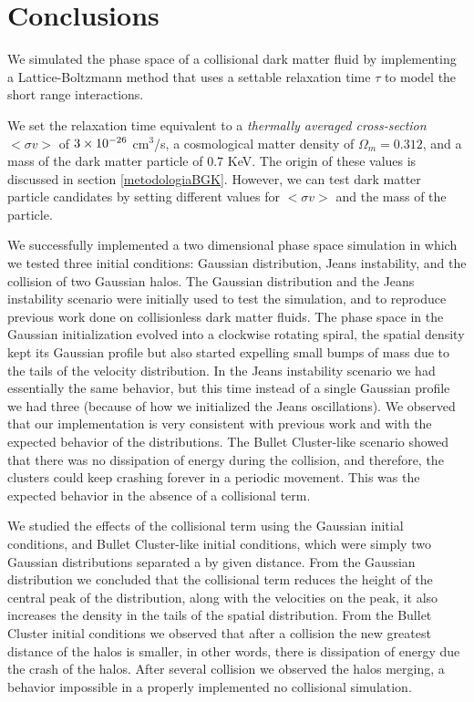 \chapter{Conclusions}
We simulated the phase space of a collisional dark matter fluid by implementing a Lattice-Boltzmann method that uses a settable relaxation time $\tau$ to model the short range interactions. 

We set the relaxation time equivalent to a \emph{thermally averaged cross-section}  $<\sigma v>$ of $ 3 \times 10^{-26}$ cm$^3$/s, a cosmological matter density of $\Omega_m = 0.312$, and a mass of the dark matter particle of $0.7$ KeV. The origin of these values is discussed in section \ref{metodologiaBGK}. However, we can test dark matter particle candidates by setting different values for $<\sigma v>$ and the mass of the particle.

We successfully implemented a two dimensional phase space simulation in which we tested three initial conditions: Gaussian distribution, Jeans instability, and the collision of two Gaussian halos. 
The Gaussian distribution and the Jeans instability scenario were initially used to test the simulation, and to reproduce previous work done on collisionless dark matter fluids. 
The phase space in the Gaussian initialization evolved into a clockwise rotating spiral, the spatial density kept its Gaussian profile but also started expelling small bumps of mass due to the tails of the velocity distribution.
In the Jeans instability scenario we had essentially the same behavior, but this time instead of a single Gaussian profile we had three (because of how we initialized the Jeans oscillations).
We observed that our implementation is very consistent with previous work and with the expected behavior of the distributions. The Bullet Cluster-like scenario showed that there was no dissipation of energy during the collision, and therefore, the clusters could keep crashing forever in a periodic movement. This was the expected behavior in the absence of a collisional term.

We studied the effects of the collisional term using the Gaussian initial conditions, and Bullet Cluster-like initial conditions, which were simply two Gaussian distributions separated a by given distance. From the Gaussian distribution we concluded that the collisional term reduces the height of the central peak of the distribution, along with the velocities on the peak, it also increases the density in the tails of the spatial distribution.
From the Bullet Cluster initial conditions we observed that after a collision the new greatest distance of the halos is smaller, in other words, there is dissipation of energy due the crash of the halos. After several collision we observed the halos merging, a behavior impossible in a properly implemented no collisional simulation.

